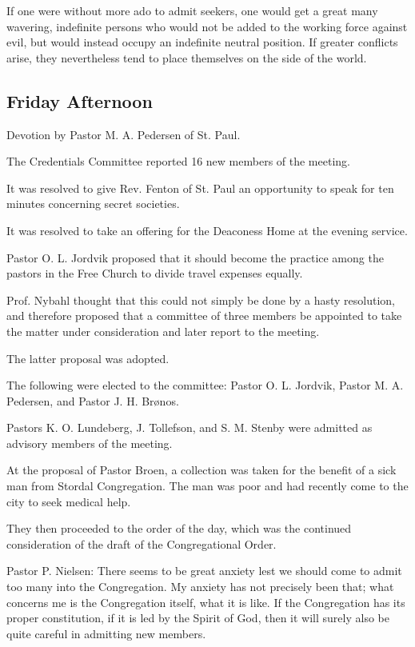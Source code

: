 If one were without more ado to admit seekers, one would get a great many wavering, indefinite persons who would not be added to the working force against evil, but would instead occupy an indefinite neutral position. If greater conflicts arise, they nevertheless tend to place themselves on the side of the world.

\subsection{Friday Afternoon}

Devotion by Pastor M. A. Pedersen of St. Paul.

The Credentials Committee reported 16 new members of the meeting.

It was resolved to give Rev. Fenton of St. Paul an opportunity to speak for ten minutes concerning secret societies.

It was resolved to take an offering for the Deaconess Home at the evening service.

Pastor O. L. Jordvik proposed that it should become the practice among the pastors in the Free Church to divide travel expenses equally.

Prof. Nybahl thought that this could not simply be done by a hasty resolution, and therefore proposed that a committee of three members be appointed to take the matter under consideration and later report to the meeting.

The latter proposal was adopted.

The following were elected to the committee: Pastor O. L. Jordvik, Pastor M. A. Pedersen, and Pastor J. H. Brønos.

Pastors K. O. Lundeberg, J. Tollefson, and S. M. Stenby were admitted as advisory members of the meeting.

At the proposal of Pastor Broen, a collection was taken for the benefit of a sick man from Stordal Congregation. The man was poor and had recently come to the city to seek medical help.

They then proceeded to the order of the day, which was the continued consideration of the draft of the Congregational Order.

Pastor P. Nielsen: There seems to be great anxiety lest we should come to admit too many into the Congregation. My anxiety has not precisely been that; what concerns me is the Congregation itself, what it is like. If the Congregation has its proper constitution, if it is led by the Spirit of God, then it will surely also be quite careful in admitting new members.


